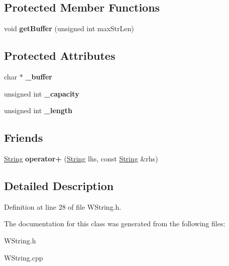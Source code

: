\subsection*{\-Protected \-Member \-Functions}
\begin{DoxyCompactItemize}
\item 
\hypertarget{classString_aa132e2b548ce6cbc48dc2761cab5c944}{
void {\bfseries get\-Buffer} (unsigned int max\-Str\-Len)}
\label{classString_aa132e2b548ce6cbc48dc2761cab5c944}

\end{DoxyCompactItemize}
\subsection*{\-Protected \-Attributes}
\begin{DoxyCompactItemize}
\item 
\hypertarget{classString_abccec894d931600e2428a1be15db0c83}{
char $\ast$ {\bfseries \-\_\-buffer}}
\label{classString_abccec894d931600e2428a1be15db0c83}

\item 
\hypertarget{classString_ae525e8ac0d02eaedd3b6e287df4ddcee}{
unsigned int {\bfseries \-\_\-capacity}}
\label{classString_ae525e8ac0d02eaedd3b6e287df4ddcee}

\item 
\hypertarget{classString_ad4ffdf5de1868afeae32a4b85cc20306}{
unsigned int {\bfseries \-\_\-length}}
\label{classString_ad4ffdf5de1868afeae32a4b85cc20306}

\end{DoxyCompactItemize}
\subsection*{\-Friends}
\begin{DoxyCompactItemize}
\item 
\hypertarget{classString_a0ca7980da94bb8d8f70b8ef4b0b9edd7}{
\hyperlink{classString}{\-String} {\bfseries operator+} (\hyperlink{classString}{\-String} lhs, const \hyperlink{classString}{\-String} \&rhs)}
\label{classString_a0ca7980da94bb8d8f70b8ef4b0b9edd7}

\end{DoxyCompactItemize}


\subsection{\-Detailed \-Description}


\-Definition at line 28 of file \-W\-String.\-h.



\-The documentation for this class was generated from the following files\-:\begin{DoxyCompactItemize}
\item 
\-W\-String.\-h\item 
\-W\-String.\-cpp\end{DoxyCompactItemize}
